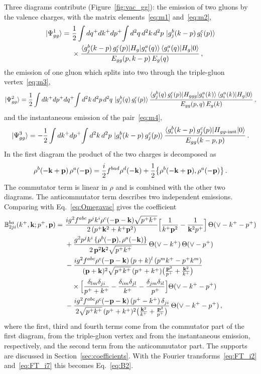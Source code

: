 Three diagrams contribute (Figure~\ref{fig:vac_gg}): the emission of two gluons by the valence charges, with the matrix elements~\eqref{eq:m1} and~\eqref{eq:m2},
\begin{align}
\ket{\Psi^{1}_{gg}}=\ &\frac12\int dq^+dk^+dp^+\!\int d^2q\,d^2k\,d^2p\,\ket{g^b_j(k-p)\,g^c_l(p)}\notag\\&\times\frac{\braket{g^b_j(k-p)\,g^c_l(p)|H_g|g^a_i(q)}\braket{g^a_i(q)|H_g|0}}{E_{gg}(p,k-p)\,E_g(q)}\,,
\end{align}
the emission of one gluon which splits into two through the triple-gluon vertex~\eqref{eq:m3},
\begin{align}
\ket{\Psi^{2}_{gg}}=\frac12\int dk^+dp^+dq^+\!\int d^2k\,d^2p\,d^2q\,\ket{g^b_j(q)\,g^c_l(p)}\frac{\braket{g^b_j(q)\,g^c_l(p)|H_{ggg}|g^a_i(k)}\braket{g^a_i(k)|H_g|0}}{E_{gg}(p,q)\,E_g(k)}\,,
\end{align}
and the instantaneous emission of the pair~\eqref{eq:m4},
\begin{align}
\ket{\Psi^{3}_{gg}}=-\frac12\int dk^+dp^+\!\int d^2k\,d^2p\,\ket{g^b_i(k-p)\,g^c_j(p)}\frac{\braket{g^b_i(k-p)\,g^c_j(p)|H_{gg\text{-inst}}|0}}{E_{gg}(k-p,p)}\,.
\end{align}
In the first diagram the product of the two charges is decomposed as
\begin{align}\label{eq:decomp}
\rho^b(-\mathbf{k}+\mathbf{p})\,\rho^a(-\mathbf{p})=\frac{i}{2}f^{bad}\rho^d(-\mathbf{k})+\frac12\big\{\rho^b(-\mathbf{k}+\mathbf{p}),\rho^a(-\mathbf{p})\big\}\,.
\end{align}
The commutator term is linear in $\rho$ and is combined with the other two diagrams. The anticommutator term describes two independent emissions. Comparing with Eq.~\eqref{eq:Omegavac} gives the coefficient
\begin{align}\label{eq:B2mom}
\mf B^{ba}_{2ji}(k^+,\v k;p^+,\v p)=\ &\frac{ig^2f^{abc}\,p^jk^i\rho^c(-\v p-\v k)\sqrt{p^+k^+}}{2\,(p^+\v k^2+k^+\v p^2)}\Big[\frac{1}{k^+\v p^2}-\frac{1}{\v k^2p^+}\Big]\,\Theta(\vee-k^+-p^+)
\notag\\&
+\frac{g^2p^jk^i\,\{\rho^b(-\v p),\rho^a(-\v k)\}}{2\,\v p^2\v k^2\sqrt{p^+k^+}}\,\Theta(\vee-k^+)\,\Theta(\vee-p^+)
\notag\\&
-\frac{ig^2f^{abc}\rho^c(-\v p-\v k)\,(p+k)^l\,(p^mk^+-p^+k^m)}{(\v p+\v k)^2\sqrt{p^+k^+}\,(p^++k^+)\big(\frac{\v p^2}{p^+}+\frac{\v k^2}{k^+}\big)}\notag\\&\quad\times\Big[\frac{\delta_{lm}\delta_{ji}}{p^++k^+}-\frac{\delta_{im}\delta_{jl}}{k^+}-\frac{\delta_{jm}\delta_{il}}{p^+}\Big]\Theta(\vee-k^+-p^+)
\notag\\&
-\frac{ig^2f^{abc}\rho^c(-\v p-\v k)\,(p^+-k^+)\,\delta_{ji}}{2\sqrt{p^+k^+}\,(p^++k^+)^2\big(\frac{\v k^2}{k^+}+\frac{\v p^2}{p^+}\big)}\,\Theta(\vee-k^+-p^+)\,,
\end{align} 
where the first, third and fourth terms come from the commutator part of the first diagram, from the triple-gluon vertex and from the instantaneous emission, respectively, and the second term from the anticommutator part. The supports are discussed in Section~\ref{sec:coefficients}. With the Fourier transforms~\eqref{eq:FT_i2} and~\eqref{eq:FT_i7} this becomes Eq.~\eqref{eq:B2}.

